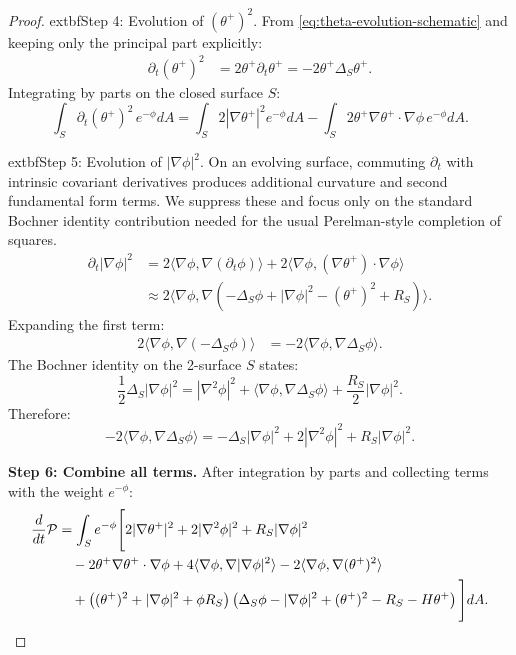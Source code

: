 \begin{proof}
	extbf{Step 4: Evolution of $(\theta^+)^2$.}
From \eqref{eq:theta-evolution-schematic} and keeping only the principal part explicitly:
\begin{align}
\partial_t(\theta^+)^2 &= 2\theta^+\partial_t\theta^+ = -2\theta^+\Delta_S\theta^+.
\end{align}
Integrating by parts on the closed surface $S$:
\begin{equation}
\int_S \partial_t(\theta^+)^2 \, e^{-\phi}dA = \int_S 2|\nabla\theta^+|^2 e^{-\phi}dA - \int_S 2\theta^+\nabla\theta^+\cdot\nabla\phi \, e^{-\phi}dA.
\label{eq:theta-sq-evol}
\end{equation}

	extbf{Step 5: Evolution of $|\nabla\phi|^2$.}
On an evolving surface, commuting $\partial_t$ with intrinsic covariant derivatives produces additional curvature and second fundamental form terms. We suppress these and focus only on the standard Bochner identity contribution needed for the usual Perelman-style completion of squares.
\begin{align}
\partial_t|\nabla\phi|^2 &= 2\langle\nabla\phi, \nabla(\partial_t\phi)\rangle + 2\langle\nabla\phi, (\nabla\theta^+)\cdot\nabla\phi\rangle \\
&\approx 2\langle\nabla\phi, \nabla(-\Delta_S\phi + |\nabla\phi|^2 - (\theta^+)^2 + R_S)\rangle.
\end{align}
Expanding the first term:
\begin{align}
2\langle\nabla\phi, \nabla(-\Delta_S\phi)\rangle &= -2\langle\nabla\phi, \nabla\Delta_S\phi\rangle.
\end{align}
The Bochner identity on the 2-surface $S$ states:
\begin{equation}
\frac{1}{2}\Delta_S|\nabla\phi|^2 = |\nabla^2\phi|^2 + \langle\nabla\phi, \nabla\Delta_S\phi\rangle + \frac{R_S}{2}|\nabla\phi|^2.
\end{equation}
Therefore:
\begin{equation}
-2\langle\nabla\phi, \nabla\Delta_S\phi\rangle = -\Delta_S|\nabla\phi|^2 + 2|\nabla^2\phi|^2 + R_S|\nabla\phi|^2.
\end{equation}

\textbf{Step 6: Combine all terms.}
After integration by parts and collecting terms with the weight $e^{-\phi}$:
\begin{align}
\frac{d}{dt}\mathcal{P} &= \int_S e^{-\phi}\Bigg[2|\nabla\theta^+|^2 + 2|\nabla^2\phi|^2 + R_S|\nabla\phi|^2 \notag\\
&\quad - 2\theta^+\nabla\theta^+\cdot\nabla\phi + 4\langle\nabla\phi, \nabla|\nabla\phi|^2\rangle - 2\langle\nabla\phi, \nabla(\theta^+)^2\rangle \notag\\
&\quad + \left((\theta^+)^2 + |\nabla\phi|^2 + \phi R_S\right)\left(\Delta_S\phi - |\nabla\phi|^2 + (\theta^+)^2 - R_S - H\theta^+\right)\Bigg]dA.
\label{eq:P-evolution-full}
\end{align}


\end{proof}
